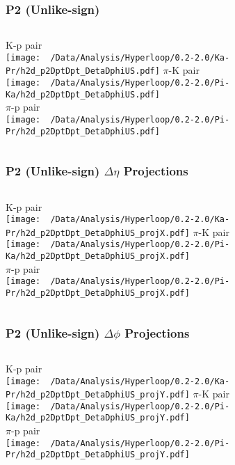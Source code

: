 \documentclass{beamer}
\begin{document}
\begin{frame}
	\frametitle{P2 (Unlike-sign)}
	\begin{columns}
		\centering
		K-p pair\\
		\texttt{[image: ~/Data/Analysis/Hyperloop/0.2-2.0/Ka-Pr/h2d\_p2DptDpt\_DetaDphiUS.pdf]}
		\centering
		$\pi$-K pair\\
		\texttt{[image: ~/Data/Analysis/Hyperloop/0.2-2.0/Pi-Ka/h2d\_p2DptDpt\_DetaDphiUS.pdf]}\\$\pi$-p pair\\
		\texttt{[image: ~/Data/Analysis/Hyperloop/0.2-2.0/Pi-Pr/h2d\_p2DptDpt\_DetaDphiUS.pdf]}
	\end{columns}
\end{frame}
\begin{frame}
	\frametitle{P2 (Unlike-sign) $\Delta\eta$ Projections}
	\begin{columns}
		\column{0.5\textwidth}
		\centering
		K-p pair\\
		\texttt{[image: ~/Data/Analysis/Hyperloop/0.2-2.0/Ka-Pr/h2d\_p2DptDpt\_DetaDphiUS\_projX.pdf]}
		\column{0.5\textwidth}
		\centering
		$\pi$-K pair\\
		\texttt{[image: ~/Data/Analysis/Hyperloop/0.2-2.0/Pi-Ka/h2d\_p2DptDpt\_DetaDphiUS\_projX.pdf]}\\$\pi$-p pair\\
		\texttt{[image: ~/Data/Analysis/Hyperloop/0.2-2.0/Pi-Pr/h2d\_p2DptDpt\_DetaDphiUS\_projX.pdf]}
	\end{columns}
\end{frame}
\begin{frame}
	\frametitle{P2 (Unlike-sign) $\Delta\phi$ Projections}
	\begin{columns}
		\centering
		K-p pair\\
		\texttt{[image: ~/Data/Analysis/Hyperloop/0.2-2.0/Ka-Pr/h2d\_p2DptDpt\_DetaDphiUS\_projY.pdf]}
		\centering
		$\pi$-K pair\\
		\texttt{[image: ~/Data/Analysis/Hyperloop/0.2-2.0/Pi-Ka/h2d\_p2DptDpt\_DetaDphiUS\_projY.pdf]}\\$\pi$-p pair\\
		\texttt{[image: ~/Data/Analysis/Hyperloop/0.2-2.0/Pi-Pr/h2d\_p2DptDpt\_DetaDphiUS\_projY.pdf]}
	\end{columns}
\end{frame}
\end{document}
